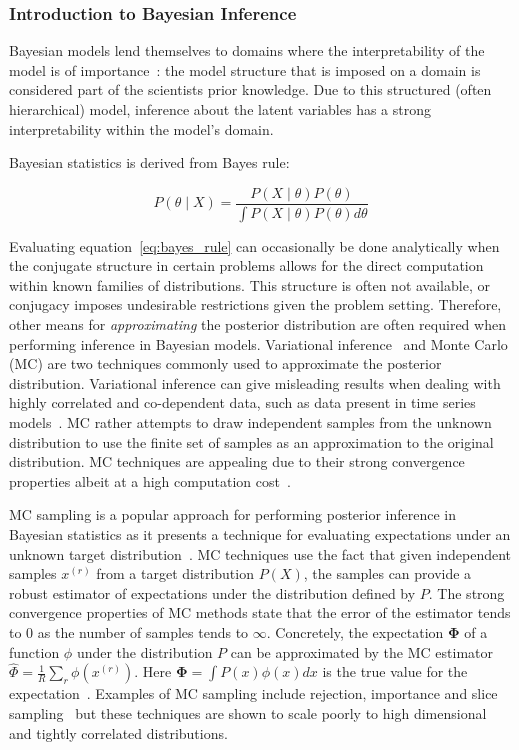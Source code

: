\subsubsection{Introduction to Bayesian Inference}

Bayesian models lend themselves to domains where the interpretability of the model is of importance~\citep{gelman2014bayesian}: the model structure that is imposed on a domain is considered part of the scientists prior knowledge. Due to this structured (often hierarchical) model, inference about the latent variables has a strong interpretability within the model's domain. 

Bayesian statistics is derived from Bayes rule:

\begin{equation}\label{eq:bayes_rule}
	P(\theta \mid X) = \frac{P(X \mid \theta)P(\theta)}{\int P(X \mid \theta)P(\theta) d\theta}
\end{equation}

Evaluating equation~\ref{eq:bayes_rule} can occasionally be done analytically when the conjugate structure in certain problems allows for the direct computation within known families of distributions. This structure is often not available, or conjugacy imposes undesirable restrictions given the problem setting. Therefore, other means for \textit{approximating} the posterior distribution are often required when performing inference in Bayesian models. Variational inference~\citep{attias2000variational,saul1996exploiting,saul1996mean,blei2003latent} and Monte Carlo (MC) are two techniques commonly used to approximate the posterior distribution. Variational inference can give misleading results when dealing with highly correlated and co-dependent data, such as data present in time series models~\citep{turner2011two}. MC rather attempts to draw independent samples from the unknown distribution to use the finite set of samples as an approximation to the original distribution. MC techniques are appealing due to their strong convergence properties albeit at a high computation cost~\citep{mackay1998introduction}.

MC sampling is a popular approach for performing posterior inference in Bayesian statistics as it presents a technique for evaluating expectations under an unknown target distribution~\citep{mackay1998introduction}. MC techniques use the fact that given independent samples $x^{(r)}$ from a target distribution $P(X)$, the samples can provide a robust estimator of expectations under the distribution defined by $P$. The strong convergence properties of MC methods state that the error of the estimator tends to $0$ as the number of samples tends to $\infty$. Concretely, the expectation $\mathbf{\Phi}$ of a function $\phi$ under the distribution $P$ can be approximated by the MC estimator $\hat{\Phi} = \frac{1}{R}\sum\limits_r \phi(x^{(r)})$. Here $\mathbf{\Phi} = \int P(x)\phi(x) dx$ is the true value for the expectation~\citep{mackay1998introduction}. Examples of MC sampling include rejection, importance and slice sampling~\citep{neal2003slice} but these techniques are shown to scale poorly to high dimensional and tightly correlated distributions.

